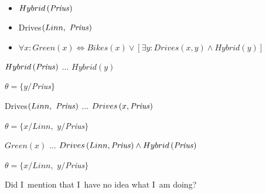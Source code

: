 \documentclass{article}
\begin{document}
\begin{itemize}
\item $Hybrid\left( \text{\textit{Prius}}\right) $

\item Drives$\left( Linn,\text{ \textit{Prius}}\right) $

\item $\forall x:Green\left( x\right) \Leftrightarrow Bikes\left( x\right)
\vee \left[ \exists y:Drives\left( x,y\right) \wedge Hybrid\left( y\right) %
\right] $
\end{itemize}

$Hybrid\left( \text{\textit{Prius}}\right) $ ... $Hybrid\left( y\right) $

$\theta =\{y/$\textit{Prius}$\}$

Drives$\left( Linn,\text{ \textit{Prius}}\right) $ ... $Drives\left( x,\text{%
\textit{Prius}}\right) $

$\theta =\{x/Linn,$ $y/$\textit{Prius}$\}$

$Green\left( x\right) $ ... $Drives\left( Linn,\text{\textit{Prius}}\right)
\wedge Hybrid\left( \text{\textit{Prius}}\right) $

$\theta =\{x/Linn,$ $y/$\textit{Prius}$\}$

Did I\ mention that I\ have no idea what I\ am doing?
\end{document}
